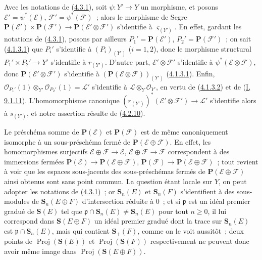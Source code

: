 \begin{env}[4.3.5]
\label{II.4.3.5-fr}
Avec les notations de (\hyperref[II.4.3.1-fr]{4.3.1}), soit
$\psi:Y'\to Y$ un morphisme, et posons
$\mathcal{E}'=\psi^*(\mathcal{E})$, $\mathcal{F}'=\psi^*(\mathcal{F})$~;
alors le morphisme de Segre
$\mathbf{P}(\mathcal{E}')\times\mathbf{P}(\mathcal{F}')
\to\mathbf{P}(\mathcal{E}'\otimes\mathcal{F}')$ s'identifie à
$\varsigma_{(Y')}$. En effet, gardant les notations de
(\hyperref[II.4.3.1-fr]{4.3.1}), posons par ailleurs
$P_1'=\mathbf{P}(\mathcal{E}')$, $P_2'=\mathbf{P}(\mathcal{F}')$~; on sait
(\hyperref[II.4.1.3.1-fr]{4.1.3.1}) que $P_i'$ s'identifie à $(P_i)_{(Y')}$
($i=1,2$), donc le morphisme structural $P_1'\times P_2'\to Y'$ s'identifie
à $r_{(Y')}$. D'autre part,
$\mathcal{E}'\otimes\mathcal{F}'$ s'identifie à
$\psi^*(\mathcal{E}\otimes\mathcal{F})$, donc
$\mathbf{P}(\mathcal{E}'\otimes\mathcal{F}')$ s'identifie à
$(\mathbf{P}(\mathcal{E}\otimes\mathcal{F}))_{(Y')}$
(\hyperref[II.4.1.3.1-fr]{4.1.3.1}). Enfin,
$\mathcal{O}_{P_1'}(1)\otimes_{Y'}\mathcal{O}_{P_2'}(1)=\mathcal{L}'$
s'identifie à $\mathcal{L}\otimes_Y\mathcal{O}_{Y'}$, en vertu de
(\hyperref[II.4.1.3.2-fr]{4.1.3.2}) et de
(\hyperref[I.9.1.11-fr]{I, 9.1.11}). L'homomorphisme canonique
$(r_{(Y')})^*(\mathcal{E}'\otimes\mathcal{F}')\to\mathcal{L}'$ s'identifie
alors à $s_{(Y')}$, et notre assertion résulte de
(\hyperref[II.4.2.10-fr]{4.2.10}).
\end{env}

\begin{remark}[4.3.6]
\label{II.4.3.6-fr}
Le préschéma somme de $\mathbf{P}(\mathcal{E})$ et
$\mathbf{P}(\mathcal{F})$ est de même canoniquement isomorphe à un
sous-préschéma fermé de $\mathbf{P}(\mathcal{E}\oplus\mathcal{F})$. En
effet, les homomorphismes surjectifs
$\mathcal{E}\oplus\mathcal{F}\to\mathcal{E}$,
$\mathcal{E}\oplus\mathcal{F}\to\mathcal{F}$ correspondent à des immersions
fermées
$\mathbf{P}(\mathcal{E})\to\mathbf{P}(\mathcal{E}\oplus\mathcal{F})$,
$\mathbf{P}(\mathcal{F})\to\mathbf{P}(\mathcal{E}\oplus\mathcal{F})$~;
tout revient à voir que les espaces sous-jacents des sous-préschémas fermés
de $\mathbf{P}(\mathcal{E}\oplus\mathcal{F})$ ainsi obtenus sont sans point
commun. La question étant locale sur $Y$, on peut adopter les notations de
(\hyperref[II.4.3.1-fr]{4.3.1})~; or $\mathbf{S}_n(E)$ et
$\mathbf{S}_n(F)$ s'identifient à des sous-modules de
$\mathbf{S}_n(E\oplus F)$ d'intersection réduite à $0$~; et si
$\mathfrak{p}$ est un idéal premier gradué de $\mathbf{S}(E)$ tel que
$\mathfrak{p}\cap\mathbf{S}_n(E)\neq\mathbf{S}_n(E)$ pour tout $n\geq0$,
il lui correspond dans $\mathbf{S}(E\oplus F)$ un idéal premier gradué dont
la trace sur $\mathbf{S}_n(E)$ est
$\mathfrak{p}\cap\mathbf{S}_n(E)$, mais qui contient $\mathbf{S}_+(F)$,
comme on le voit aussitôt~; deux points de
$\operatorname{Proj}(\mathbf{S}(E))$ et
$\operatorname{Proj}(\mathbf{S}(F))$ respectivement ne peuvent donc avoir
même image dans $\operatorname{Proj}(\mathbf{S}(E\oplus F))$.
\end{remark}

